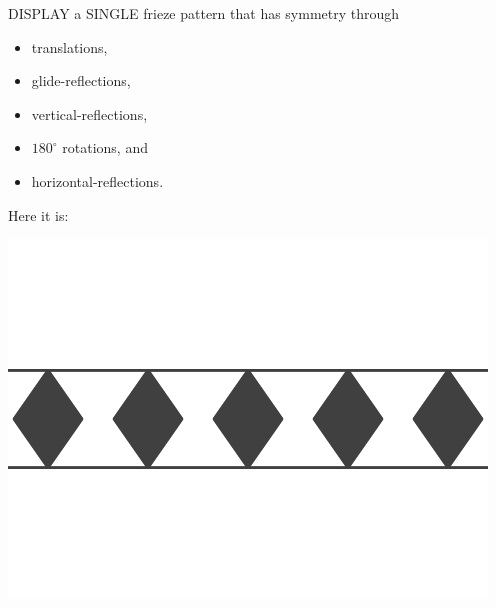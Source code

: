 \documentclass[noauthor,nooutcomes,hints,handout]{ximera}
\begin{document}
\begin{question}
  DISPLAY a SINGLE frieze pattern that has symmetry through
  \begin{itemize}
  \item translations,
  \item glide-reflections,
  \item vertical-reflections,
  \item $180^\circ$ rotations, and
  \item horizontal-reflections.
  \end{itemize}
  \begin{freeResponse}
    Here it is:
    \begin{center}
      \includegraphics[width=.6\textwidth]{ansTGV8H.png}
    \end{center}
  \end{freeResponse}
\end{question}
\end{document}
